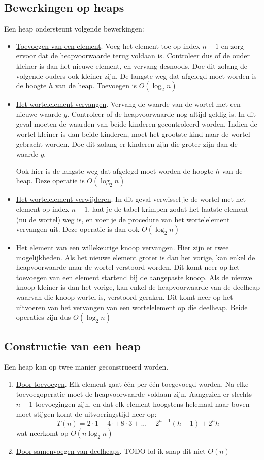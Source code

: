\documentclass{report}
\begin{document}
\subsection{Bewerkingen op heaps}
Een heap ondersteunt volgende bewerkingen:
\begin{itemize}
 \item \underline{Toevoegen van een element}. Voeg het element toe op index $n + 1$ en zorg ervoor dat de heapvoorwaarde terug voldaan is. Controleer dus of de ouder kleiner is dan het nieuwe element, en vervang desnoods. Doe dit zolang de volgende ouders ook kleiner zijn. De langste weg dat afgelegd moet worden is de hoogte $h$ van de heap. Toevoegen is $O(\log_2 n)$
 \item \underline{Het wortelelement vervangen}. Vervang de waarde van de wortel met een nieuwe waarde $g$. Controleer of de heapvoorwaarde nog altijd geldig is. In dit geval moeten de waarden van beide kinderen gecontroleerd worden. Indien de wortel kleiner is dan beide kinderen, moet het grootste kind naar de wortel gebracht worden. Doe dit zolang er kinderen zijn die groter zijn dan de waarde $g$.
 
 Ook hier is de langste weg dat afgelegd moet worden de hoogte $h$ van de heap. Deze operatie is $O(\log_2 n)$
 \item \underline{Het wortelelement verwijderen}. In dit geval verwissel je de wortel met het element op index $n - 1$, laat je de tabel krimpen zodat het laatste element (nu de wortel) weg is, en voer je de procedure van het wortelelement vervangen uit. Deze operatie is dan ook $O(\log_2 n)$
 \item \underline{Het element van een willekeurige knoop vervangen}. Hier zijn er twee mogelijkheden. Als het nieuwe element groter is dan het vorige, kan enkel de heapvoorwaarde naar de wortel verstoord worden. Dit komt neer op het toevoegen van een element startend bij de aangepaste knoop. Als de nieuwe knoop kleiner is dan het vorige, kan enkel de heapvoorwaarde van de deelheap waarvan die knoop wortel is, verstoord geraken. Dit komt neer op het uitvoeren van het vervangen van een wortelelement op die deelheap. Beide operaties zijn dus $O(\log_2 n)$
\end{itemize}

\subsection{Constructie van een heap}
Een heap kan op twee manier geconstrueerd worden.
\begin{enumerate}
 \item \underline{Door toevoegen}. Elk element gaat één per één toegevoegd worden. Na elke toevoegoperatie moet de heapvoorwaarde voldaan zijn. Aangezien er slechts $n - 1$ toevoegingen zijn, en dat elk element hoogstens helemaal naar boven moet stijgen komt de uitvoeringstijd neer op:
 $$T(n) = 2\cdot 1 + 4\cdot + 8\cdot 3 + ... + 2^{h - 1}(h - 1) + 2^h h$$
 wat neerkomt op $O(n \log_2 n)$
 \item \underline{Door samenvoegen van deelheaps}. TODO lol ik snap dit niet $O(n)$
\end{enumerate}
\end{document}
